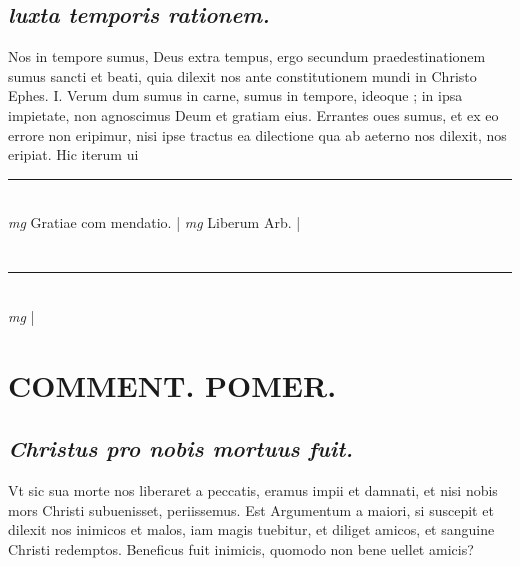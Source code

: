 \documentclass{article}
\begin{document}
\begin{pages}
\subsection*{\textit{luxta temporis rationem. }}\pstart Nos in tempore sumus, Deus extra tempus, ergo secundum praedestinationem sumus sancti et beati, quia dilexit nos ante constitutionem mundi in Christo Ephes. I. Verum dum sumus in carne, sumus in tempore, ideoque ; in ipsa impietate, non agnoscimus Deum et gratiam eius. Errantes oues sumus, et ex eo errore non eripimur, nisi ipse tractus ea dilectione qua ab aeterno nos dilexit, nos eripiat. Hic iterum ui\pend
\vspace{0.5cm}\noindent
\vspace{0.2cm}\rule{1cm}{0.2pt}\\ 
\hspace{0.2cm}\textit{mg}
\footnotesize Gratiae com mendatio. 
\normalsize| 
\hspace{0.2cm}\textit{mg}
\footnotesize Liberum Arb.  
\normalsize| 
\section*{    }
\marginpar{[ p.]}
{}
\subsection*{\textit{ }}\pstart            \pend
{}
{}
\subsection*{\textit{ }}\pstart    \pend
\vspace{0.5cm}\noindent
\vspace{0.2cm}\rule{1cm}{0.2pt}\\ 
\hspace{0.2cm}\textit{mg}
\footnotesize 
\normalsize| 
\section*{COMMENT. POMER.  }
{}
\subsection*{\textit{Christus pro nobis mortuus fuit. }}\pstart Vt sic sua morte nos liberaret a peccatis, eramus impii et damnati, et nisi nobis mors Christi subuenisset, periissemus.   \pend\pstart Est Argumentum a maiori, si suscepit et dilexit nos inimicos et malos, iam magis tuebitur, et diliget amicos, et sanguine Christi redemptos. Beneficus fuit inimicis, quomodo non bene uellet amicis?  \pend
{}
{}

\end{pages}
\end{document}
